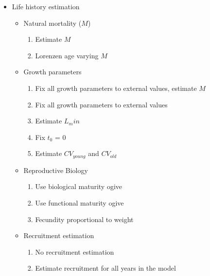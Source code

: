 \documentclass[11pt,
  english,
  letterpaper,
]{article}
\providecommand{\tightlist}{%
  \setlength{\itemsep}{0pt}\setlength{\parskip}{0pt}}
\providecommand{\tightlist}{%
  \setlength{\itemsep}{0pt}\setlength{\parskip}{0pt}}
\begin{document}
\begin{itemize}
\tightlist
\item
  Life history estimation

  \begin{itemize}
  \tightlist
  \item
    Natural mortality (\(M\))

    \begin{enumerate}
    \def\labelenumi{\arabic{enumi}.}
    \tightlist
    \item
      Estimate \(M\)
    \item
      Lorenzen age varying \(M\)
    \end{enumerate}
  \item
    Growth parameters

    \begin{enumerate}
    \def\labelenumi{\arabic{enumi}.}
    \setcounter{enumi}{2}
    \tightlist
    \item
      Fix all growth parameters to external values, estimate \(M\)
    \item
      Fix all growth parameters to external values
    \item
      Estimate \(L_min\)
    \item
      Fix \(t_0\) = 0
    \item
      Estimate \(CV_{young}\) and \(CV_{old}\)
    \end{enumerate}
  \item
    Reproductive Biology

    \begin{enumerate}
    \def\labelenumi{\arabic{enumi}.}
    \setcounter{enumi}{7}
    \tightlist
    \item
      Use biological maturity ogive
    \item
      Use functional maturity ogive
    \item
      Fecundity proportional to weight
    \end{enumerate}
  \item
    Recruitment estimation

    \begin{enumerate}
    \def\labelenumi{\arabic{enumi}.}
    \setcounter{enumi}{10}
    \tightlist
    \item
      No recruitment estimation
    \item
      Estimate recruitment for all years in the model
    \end{enumerate}
  \end{itemize}
\end{itemize}
\end{document}
